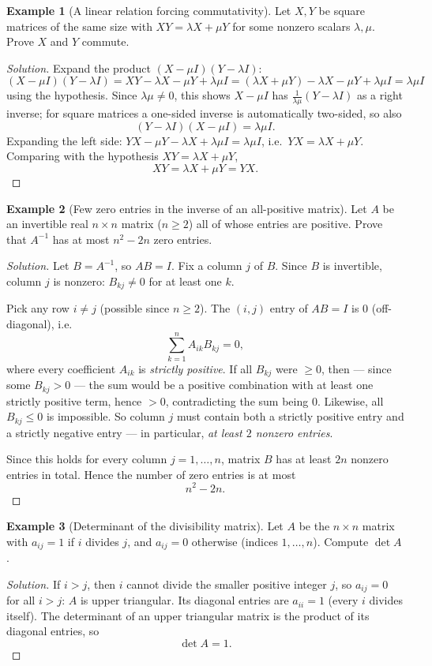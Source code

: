 \documentclass[11pt]{article}
\theoremstyle{definition}
\newtheorem{example}{Example}[section]
\begin{document}
\begin{example}[A linear relation forcing commutativity]
Let $X,Y$ be square matrices of the same size with $XY=\lambda X+\mu Y$ for some nonzero scalars $\lambda,\mu$. Prove $X$ and $Y$ commute.
\end{example}

\begin{proof}[Solution]
Expand the product $(X-\mu I)(Y-\lambda I)$:
\[
(X-\mu I)(Y-\lambda I)=XY-\lambda X-\mu Y+\lambda\mu I=(\lambda X+\mu Y)-\lambda X-\mu Y+\lambda\mu I=\lambda\mu I
\]
using the hypothesis. Since $\lambda\mu\ne0$, this shows $X-\mu I$ has $\frac1{\lambda\mu}(Y-\lambda I)$ as a right inverse; for square matrices a one-sided inverse is automatically two-sided, so also
\[
(Y-\lambda I)(X-\mu I)=\lambda\mu I.
\]
Expanding the left side: $YX-\mu Y-\lambda X+\lambda\mu I=\lambda\mu I$, i.e.\ $YX=\lambda X+\mu Y$. Comparing with the hypothesis $XY=\lambda X+\mu Y$,
\[
\boxed{XY=\lambda X+\mu Y=YX}.
\]
\end{proof}

\begin{example}[Few zero entries in the inverse of an all-positive matrix]
Let $A$ be an invertible real $n\times n$ matrix ($n\ge2$) all of whose entries are positive. Prove that $A^{-1}$ has at most $n^2-2n$ zero entries.
\end{example}
\begin{proof}[Solution]
Let $B=A^{-1}$, so $AB=I$. Fix a column $j$ of $B$. Since $B$ is invertible, column $j$ is nonzero: $B_{kj}\neq0$ for at least one $k$.

Pick any row $i\neq j$ (possible since $n\ge2$). The $(i,j)$ entry of $AB=I$ is $0$ (off-diagonal), i.e.
\[
\sum_{k=1}^n A_{ik}B_{kj}=0,
\]
where every coefficient $A_{ik}$ is \emph{strictly positive}. If all $B_{kj}$ were $\ge0$, then — since some $B_{kj}>0$ — the sum would be a positive combination with at least one strictly positive term, hence $>0$, contradicting the sum being $0$. Likewise, all $B_{kj}\le0$ is impossible. So column $j$ must contain both a strictly positive entry and a strictly negative entry — in particular, \emph{at least $2$ nonzero entries}.

Since this holds for every column $j=1,\dots,n$, matrix $B$ has at least $2n$ nonzero entries in total. Hence the number of zero entries is at most
\[
\boxed{n^2-2n}.
\]
\end{proof}

\begin{example}[Determinant of the divisibility matrix]
Let $A$ be the $n\times n$ matrix with $a_{ij}=1$ if $i$ divides $j$, and $a_{ij}=0$ otherwise (indices $1,\dots,n$). Compute $\det A$.
\end{example}
\begin{proof}[Solution]
If $i>j$, then $i$ cannot divide the smaller positive integer $j$, so $a_{ij}=0$ for all $i>j$: $A$ is upper triangular. Its diagonal entries are $a_{ii}=1$ (every $i$ divides itself). The determinant of an upper triangular matrix is the product of its diagonal entries, so
\[
\boxed{\det A=1}.
\]
\end{proof}
\end{document}

